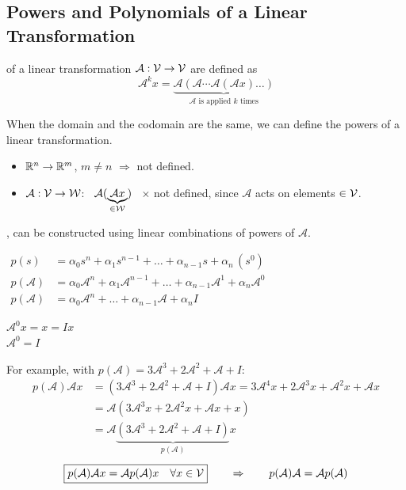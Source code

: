 \subsection{Powers and Polynomials of a Linear Transformation}\label{ss:powers}
\begin{definition}
 of a linear transformation $\mathcal{A}:\mathcal{V}\to\mathcal{V}$ are defined as
\[
\mathcal{A}^k x=\underbrace{\mathcal{A}(\mathcal{A}\cdots\mathcal{A}(\mathcal{A}x)\dots)}_{\mathcal{A}\text{ is applied }k\text{ times}}
\]
\end{definition}
When the domain and the codomain are the same, we can define the powers of a linear transformation.
\begin{itemize}[nosep,leftmargin=1.5em]
\item $\mathbb{R}^n\to\mathbb{R}^m$, $m\neq n$ $\Rightarrow$ not defined.
\item $\mathcal{A}:\mathcal{V}\to\mathcal{W}$: \ $\mathcal{A}(\underbrace{\mathcal{A}x}_{\in\mathcal{W}})$ \ $\times$ not defined, since $\mathcal{A}$ acts on elements $\in\mathcal{V}$.
\end{itemize}

\sep
\point {} can be constructed using linear combinations of powers of $\mathcal{A}$.
\begin{center}
\begin{minipage}{0.66\textwidth}
\centering$\displaystyle\begin{aligned}
p(s)&=\alpha_0s^n+\alpha_1s^{n-1}+\dots+\alpha_{n-1}s+\alpha_n\,(s^0)\\
p(\mathcal{A})&=\alpha_0\mathcal{A}^n+\alpha_1\mathcal{A}^{n-1}+\dots+\alpha_{n-1}\mathcal{A}^1+\alpha_n\mathcal{A}^0\\
p(\mathcal{A})&=\alpha_0\mathcal{A}^n+\dots+\alpha_{n-1}\mathcal{A}+\alpha_nI
\end{aligned}$
\end{minipage}\hfill
\begin{minipage}{0.28\textwidth}
\begin{keybox}
\centering
$\mathcal{A}^0x=x=Ix$\\
$\mathcal{A}^0=I$
\end{keybox}
\end{minipage}
\end{center}
For example, with $p(\mathcal{A})=3\mathcal{A}^3+2\mathcal{A}^2+\mathcal{A}+I$:
\begin{align*}
p(\mathcal{A})\mathcal{A}x&=(3\mathcal{A}^3+2\mathcal{A}^2+\mathcal{A}+I)\mathcal{A}x=3\mathcal{A}^4x+2\mathcal{A}^3x+\mathcal{A}^2x+\mathcal{A}x\\
&=\mathcal{A}(3\mathcal{A}^3x+2\mathcal{A}^2x+\mathcal{A}x+x)\\
&=\mathcal{A}\underbrace{(3\mathcal{A}^3+2\mathcal{A}^2+\mathcal{A}+I)}_{p(\mathcal{A})}x
\end{align*}
\[
\boxed{p(\mathcal{A})\mathcal{A}x=\mathcal{A}p(\mathcal{A})x\quad\forall x\in\mathcal{V}}
\qquad\Rightarrow\qquad
p(\mathcal{A})\mathcal{A}=\mathcal{A}p(\mathcal{A})
\]

